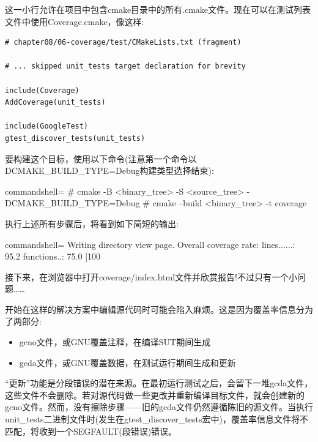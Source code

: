 这一小行允许在项目中包含cmake目录中的所有.cmake文件。现在可以在测试列表文件中使用Coverage.cmake，像这样:

\begin{lstlisting}[style=styleCMake]
# chapter08/06-coverage/test/CMakeLists.txt (fragment)

# ... skipped unit_tests target declaration for brevity

include(Coverage)
AddCoverage(unit_tests)

include(GoogleTest)
gtest_discover_tests(unit_tests)
\end{lstlisting}

要构建这个目标，使用以下命令(注意第一个命令以DCMAKE\_BUILD\_TYPE=Debug构建类型选择结束):

\begin{tcblisting}{commandshell={}}
# cmake -B <binary_tree> -S <source_tree>
    -DCMAKE_BUILD_TYPE=Debug
# cmake --build <binary_tree> -t coverage
\end{tcblisting}

执行上述所有步骤后，将看到如下简短的输出:

\begin{tcblisting}{commandshell={}}
Writing directory view page.
Overall coverage rate:
  lines......: 95.2%
  functions..: 75.0%
[100%
\end{tcblisting}

接下来，在浏览器中打开coverage/index.html文件并欣赏报告!不过只有一个小问题……



开始在这样的解决方案中编辑源代码时可能会陷入麻烦。这是因为覆盖率信息分为了两部分:

\begin{itemize}
\item 
gcno文件，或GNU覆盖注释，在编译SUT期间生成

\item 
gcda文件，或GNU覆盖数据，在测试运行期间生成和更新
\end{itemize}

“更新”功能是分段错误的潜在来源。在最初运行测试之后，会留下一堆gcda文件，这些文件不会删除。若对源代码做一些更改并重新编译目标文件，就会创建新的gcno文件。然而，没有擦除步骤——旧的gcda文件仍然遵循陈旧的源文件。当执行unit\_tests二进制文件时(发生在gtest\_discover\_tests宏中)，覆盖率信息文件将不匹配，将收到一个SEGFAULT(段错误)错误。

